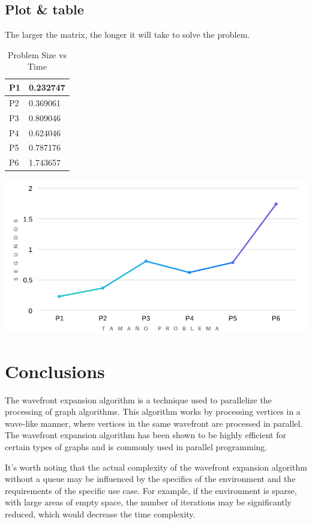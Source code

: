 \documentclass[oneside,twocolumn]{article}
\begin{document}
\subsection{Plot \& table}

The larger the matrix, the longer it will take to solve the problem.

\begin{table}[!hbt]
  \caption{Problem Size vs Time}
  \centering
  \begin{tabular}{|l|l|}
    \hline
    P1 & 0.232747 \\ \hline
    P2 & 0.369061 \\ \hline
    P3 & 0.809046 \\ \hline
    P4 & 0.624046 \\ \hline
    P5 & 0.787176 \\ \hline
    P6 & 1.743657 \\ \hline
  \end{tabular}
\end{table}

\includegraphics[scale=0.27]{plot.png}

\section{Conclusions}

The wavefront expansion algorithm is a technique used to parallelize the processing of graph algorithms. This algorithm works by processing vertices in a wave-like manner, where vertices in the same wavefront are processed in parallel. The wavefront expansion algorithm has been shown to be highly efficient for certain types of graphs and is commonly used in parallel programming.

It's worth noting that the actual complexity of the wavefront expansion algorithm without a queue may be influenced by the specifics of the environment and the requirements of the specific use case. For example, if the environment is sparse, with large areas of empty space, the number of iterations may be significantly reduced, which would decrease the time complexity.\\
\end{document}

